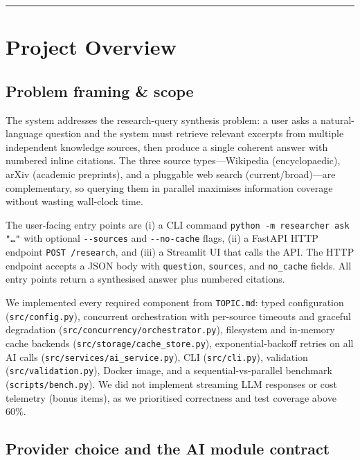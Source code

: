 \documentclass[11pt,a4paper]{article}
\begin{document}
\tableofcontents
\vspace{0.6em}\hrule\vspace{0.4em}

\section{Project Overview}

\subsection{Problem framing \& scope}

The system addresses the research-query synthesis problem: a user asks a natural-language question and the system must retrieve relevant excerpts from multiple independent knowledge sources, then produce a single coherent answer with numbered inline citations. The three source types---Wikipedia (encyclopaedic), arXiv (academic preprints), and a pluggable web search (current/broad)---are complementary, so querying them in parallel maximises information coverage without wasting wall-clock time.

The user-facing entry points are (i) a CLI command \texttt{python -m researcher ask "\ldots"} with optional \texttt{-{}-sources} and \texttt{-{}-no-cache} flags, (ii) a FastAPI HTTP endpoint \texttt{POST /research}, and (iii) a Streamlit UI that calls the API. The HTTP endpoint accepts a JSON body with \texttt{question}, \texttt{sources}, and \texttt{no\_cache} fields. All entry points return a synthesised answer plus numbered citations.

We implemented every required component from \texttt{TOPIC.md}: typed configuration (\texttt{src/config.py}), concurrent orchestration with per-source timeouts and graceful degradation (\texttt{src/concurrency/orchestrator.py}), filesystem and in-memory cache backends (\texttt{src/storage/cache\_store.py}), exponential-backoff retries on all AI calls (\texttt{src/services/ai\_service.py}), CLI (\texttt{src/cli.py}), validation (\texttt{src/validation.py}), Docker image, and a sequential-vs-parallel benchmark (\texttt{scripts/bench.py}). We did not implement streaming LLM responses or cost telemetry (bonus items), as we prioritised correctness and test coverage above 60\%.

\subsection{Provider choice and the AI module contract}
\end{document}
